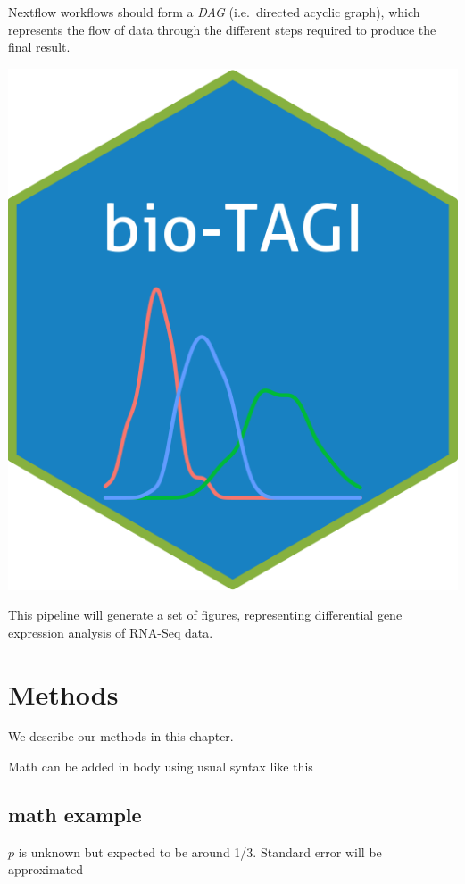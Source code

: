 \documentclass[
  openany]{book}
\begin{document}
Nextflow workflows should form a \emph{DAG} (i.e.~directed acyclic graph), which represents the flow of data through the different steps
required to produce the final result.

\includegraphics{images/biotagi.png}

This pipeline will generate a set of figures, representing differential gene expression analysis of RNA-Seq data.

\hypertarget{methods}{%
\chapter{Methods}\label{methods}}

We describe our methods in this chapter.

Math can be added in body using usual syntax like this

\hypertarget{math-example}{%
\section{math example}\label{math-example}}

\(p\) is unknown but expected to be around 1/3. Standard error will be approximated
\end{document}
